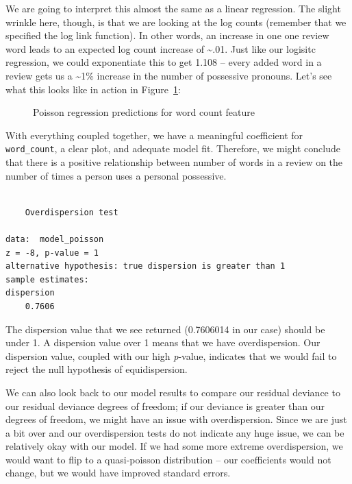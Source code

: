 \documentclass[
  letterpaper,
]{krantz}
\begin{document}
We are going to interpret this almost the same as a linear regression.
The slight wrinkle here, though, is that we are looking at the log
counts (remember that we specified the log link function). In other
words, an increase in one one review word leads to an expected log count
increase of \textasciitilde.01. Just like our logisitc regression, we
could exponentiate this to get 1.108 -- every added word in a review
gets us a \textasciitilde1\% increase in the number of possessive
pronouns. Let's see what this looks like in action in
Figure~\ref{fig-poisson-regression}:

\begin{figure}[H]


\caption{\label{fig-poisson-regression}Poisson regression predictions
for word count feature}

\end{figure}%

With everything coupled together, we have a meaningful coefficient for
\texttt{word\_count}, a clear plot, and adequate model fit. Therefore,
we might conclude that there is a positive relationship between number
of words in a review on the number of times a person uses a personal
possessive.

\begin{verbatim}

    Overdispersion test

data:  model_poisson
z = -8, p-value = 1
alternative hypothesis: true dispersion is greater than 1
sample estimates:
dispersion 
    0.7606 
\end{verbatim}

The dispersion value that we see returned (0.7606014 in our case) should
be under 1. A dispersion value over 1 means that we have overdispersion.
Our dispersion value, coupled with our high \emph{p}-value, indicates
that we would fail to reject the null hypothesis of equidispersion.

We can also look back to our model results to compare our residual
deviance to our residual deviance degrees of freedom; if our deviance is
greater than our degrees of freedom, we might have an issue with
overdispersion. Since we are just a bit over and our overdispersion
tests do not indicate any huge issue, we can be relatively okay with our
model. If we had some more extreme overdispersion, we would want to flip
to a quasi-poisson distribution -- our coefficients would not change,
but we would have improved standard errors.
\end{document}
